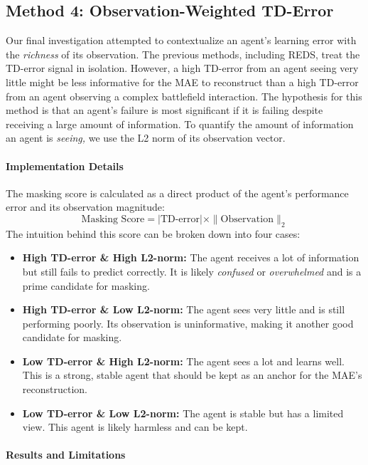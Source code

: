 \subsection{Method 4: Observation-Weighted TD-Error}

Our final investigation attempted to contextualize an agent's learning error with the \textit{richness} of its observation. The previous methods, including REDS, treat the TD-error signal in isolation. However, a high TD-error from an agent seeing very little might be less informative for the MAE to reconstruct than a high TD-error from an agent observing a complex battlefield interaction.
The hypothesis for this method is that an agent's failure is most significant if it is failing despite receiving a large amount of information. To quantify the amount of information an agent is \textit{seeing,} we use the L2 norm of its observation vector.

\paragraph{Implementation Details}
The masking score is calculated as a direct product of the agent's performance error and its observation magnitude:
\begin{equation}
    \text{Masking Score} = |\text{TD-error}| \times \| \text{Observation} \|_2
    \label{eq:obs_weighted_td}
\end{equation}
The intuition behind this score can be broken down into four cases:
\begin{itemize}
    \item \textbf{High TD-error \& High L2-norm:} The agent receives a lot of information but still fails to predict correctly. It is likely \textit{confused} or \textit{overwhelmed} and is a prime candidate for masking.
    \item \textbf{High TD-error \& Low L2-norm:} The agent sees very little and is still performing poorly. Its observation is uninformative, making it another good candidate for masking.
    \item \textbf{Low TD-error \& High L2-norm:} The agent sees a lot and learns well. This is a strong, stable agent that should be kept as an anchor for the MAE's reconstruction.
    \item \textbf{Low TD-error \& Low L2-norm:} The agent is stable but has a limited view. This agent is likely harmless and can be kept.
\end{itemize}

\paragraph{Results and Limitations}


